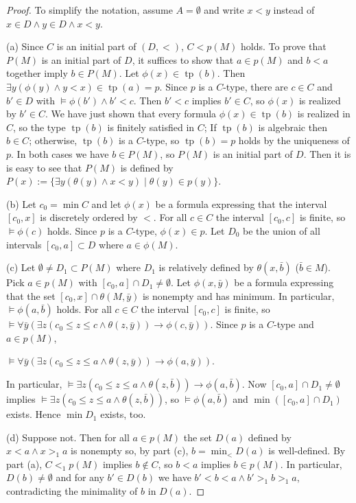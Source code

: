 \documentclass[10pt,a4paper]{amsart}
\DeclareMathOperator{\tp}{tp}
\begin{document}
\begin{proof}To simplify the notation, assume $A=\emptyset$ and  write $x<y$ instead of $x\in D\land y\in D\land x<y$. 

(a) Since $C$ is an initial part of $(D,<)$,    $C<p(M)$ holds. 
To prove that $P(M)$ is an initial part of $D$, it suffices to show that $a\in p(M)$ and $b< a$ together imply $b\in P(M)$. Let $\phi(x)\in \tp(b)$. 
Then  $\exists y(\phi(y)\land y< x)\in\tp(a)=p$. Since $p$ is   a $C$-type, there are $c\in C$ and $b'\in D$ with $\models\phi(b')\land b'< c$.
Then $b'< c$ implies $b'\in C$, so   $\phi(x)$ is realized by $b'\in C$. We have just shown that every formula $\phi(x)\in \tp(b)$ is realized in $C$, so the type $\tp(b)$ is finitely satisfied in $C$; 
If $\tp(b)$ is algebraic  then $b\in C$; otherwise, $\tp (b)$ is a $C$-type, so $\tp(b)=p$ holds by the uniqueness of $p$.
In both cases we have $b\in P(M)$, so $P(M)$ is an initial part of $D$. Then it is is easy to see that $P(M)$ is defined by  $P(x):=\{\exists y(\theta(y) \land   x<y)\mid \theta(y)\in p(y)\}$. 

\smallskip
(b) Let $c_0=\min C$ and let $\phi(x)$ be a formula expressing that the interval $[c_0,x]$ is discretely ordered by $<$.  For all $c\in C$ the interval $[c_0,c]$ is finite, so $\models  \phi(c)$ holds. Since $p$ is a $C$-type, $\phi(x)\in p$. Let $D_0$ be the union of all intervals $[c_0,a]\subset D$ where $a\in\phi(M)$.  

\smallskip
(c) Let $\emptyset\neq D_1\subset P(M)$  where $D_1$ is relatively defined by $\theta(x,\bar b)$ ($\bar b\in M$). Pick $a\in p(M)$ with $[c_0,a]\cap D_1\neq\emptyset$.  Let $\phi(x,\bar y)$ be a formula expressing that the set
$[c_0,x]\cap\theta(M,\bar y)$ is nonempty and has minimum. 
In particular, $\models\phi(a,\bar b)$ holds. For all $c\in C$ the interval $[c_0,c]$ is finite, so $\models \forall \bar y \left(\exists z(c_0\leq z\leq c\land \theta(z,\bar y))\rightarrow \phi(c,\bar y)\right)$. Since $p$ is a $C$-type and $a\in p(M)$, 
\begin{center} 
$\models \forall \bar y \left(\exists z(c_0\leq z\leq a\land \theta(z,\bar y))\rightarrow \phi(a,\bar y)\right)$.  
\end{center}
In particular,   $\models  \exists z(c_0\leq z\leq a\land \theta(z,\bar b))\rightarrow \phi(a,\bar b)$.  Now  $[c_0,a]\cap D_1\neq \emptyset$ implies $\models  \exists z(c_0\leq z\leq a\land \theta(z,\bar b))$, so $\models\phi(a,\bar b)$ and $\min ([c_0,a]\cap D_1)$ exists. Hence $\min D_1$ exists, too.

\smallskip
(d) Suppose not. Then for all $a\in p(M)$ the set $D(a)$ defined by $x<a\land x>_1 a$ is nonempty so, by part (c), $b=\min_{<} D(a)$ is well-defined. By part (a), $C<_1p(M)$ implies $b\notin C$, so  $b<a$ implies $b\in p(M)$. In particular, $D(b)\neq\emptyset$ and for any $b'\in D(b)$ we have $b'<b<a\land b'>_1b>_1 a$, contradicting the minimality of $b$ in $D(a)$. 
\end{proof}
\end{document}
